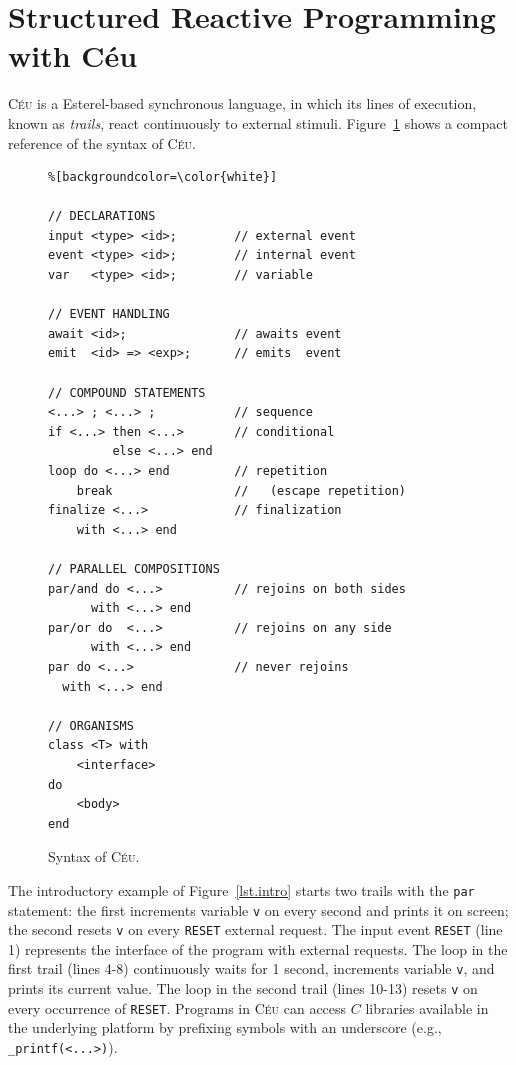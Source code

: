 \documentclass{acm_proc_article-sp}
\newcommand{\CEU}{\textsc{C\'{e}u}\xspace}
\newcommand{\code}[1] {{\small{\texttt{#1}}}}
\newcommand{\1}{\;}
\newcommand{\2}{\;\;}
\newcommand{\3}{\;\;\;}
\newcommand{\5}{\;\;\;\;\;}
\begin{document}
\section{Structured Reactive Programming with C\'eu}
\label{sec.ceu}

\CEU is a Esterel-based synchronous language, in which its lines of execution, 
known as \emph{trails}, react continuously to external stimuli.
%
Figure~\ref{lst.syntax} shows a compact reference of the syntax of \CEU.

\begin{figure}[t]
\begin{lstlisting}%[backgroundcolor=\color{white}]

// DECLARATIONS
input <type> <id>;        // external event
event <type> <id>;        // internal event
var   <type> <id>;        // variable

// EVENT HANDLING
await <id>;               // awaits event
emit  <id> => <exp>;      // emits  event

// COMPOUND STATEMENTS
<...> ; <...> ;           // sequence
if <...> then <...>       // conditional
         else <...> end
loop do <...> end         // repetition
    break                 //   (escape repetition)
finalize <...>            // finalization
    with <...> end

// PARALLEL COMPOSITIONS
par/and do <...>          // rejoins on both sides
      with <...> end
par/or do  <...>          // rejoins on any side
      with <...> end
par do <...>              // never rejoins
  with <...> end

// ORGANISMS
class <T> with
    <interface>
do
    <body>
end
\end{lstlisting}
\caption{ Syntax of \CEU.
\label{lst.syntax}
}
\end{figure}

The introductory example of Figure~\ref{lst.intro} starts two trails with the 
\code{par} statement: the first increments variable \code{v} on every second 
and prints it on screen; the second resets \code{v} on every \code{RESET} 
external request.
%
The input event \code{RESET} (line 1) represents the interface of the program 
with external requests.
The loop in the first trail (lines 4-8) continuously waits for 1 second, 
increments variable \code{v}, and prints its current value.
The loop in the second trail (lines 10-13) resets \code{v} on every occurrence 
of \code{RESET}.
%
Programs in \CEU can access $C$ libraries available in the underlying platform 
by prefixing symbols with an underscore (e.g., \code{\_printf(<...>)}).
\end{document}
